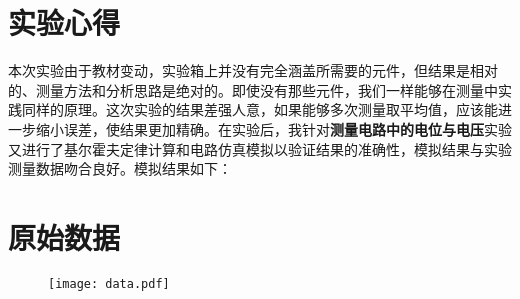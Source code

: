 \documentclass[a4paper,utf8]{article}
\begin{document}
\section{实验心得}
    本次实验由于教材变动，实验箱上并没有完全涵盖所需要的元件，但结果是相对的、测量方法和分析思路是绝对的。即使没有那些元件，我们一样能够在测量中实践同样的原理。这次实验的结果差强人意，如果能够多次测量取平均值，应该能进一步缩小误差，使结果更加精确。在实验后，我针对\textbf{测量电路中的电位与电压}实验又进行了基尔霍夫定律计算和电路仿真模拟以验证结果的准确性，模拟结果与实验测量数据吻合良好。模拟结果如下：\par
    \begin{figure}[!ht]
         \hspace{5mm}
    \end{figure}
\newpage
\section{原始数据}
    \begin{figure}[!ht]
        \texttt{[image: data.pdf]}
    \end{figure}
\end{document}
